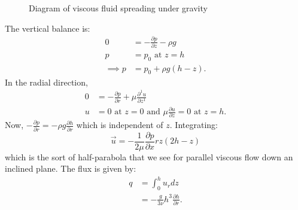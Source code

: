 \documentclass[../Main.tex]{subfiles}
\begin{document}
\begin{figure}
    \centering
    \caption{Diagram of viscous fluid spreading under gravity}
    \label{figViscousGravity}
\end{figure}
The vertical balance is:
\begin{align*}
    0 &= -\frac{\partial p}{\partial z} - \rho g \\
    p &= p_0 \text{ at }  z = h \\
    \implies p&= p_0 + \rho g (h - z).
\end{align*}
In the radial direction,
\begin{align*}
    0 &= -\frac{\partial p}{\partial r} + \mu \frac{\partial^{1}u}{\partial z^{1}} \\
    u &= 0 \text{ at } z = 0 \text{ and } \mu \frac{\partial u}{\partial z} = 0 \text{ at } z = h.
\end{align*}
Now, $-\frac{\partial p}{\partial r} = - \rho g \frac{\partial h}{\partial r}$ which is independent of $z$. Integrating: %
\begin{equation*}
    \vec u = -\frac1{2\mu} \frac{\partial p}{\partial x}r z(2h - z)
\end{equation*}
which is the sort of half-parabola that we see for parallel viscous flow down an inclined plane. The flux is given by:
\begin{align*}
    q &= \int_{0}^{h} u_r dz \\
    &= -\frac{g}{3\nu} h^3 \frac{\partial h}{\partial r}.
\end{align*}
\end{document}
